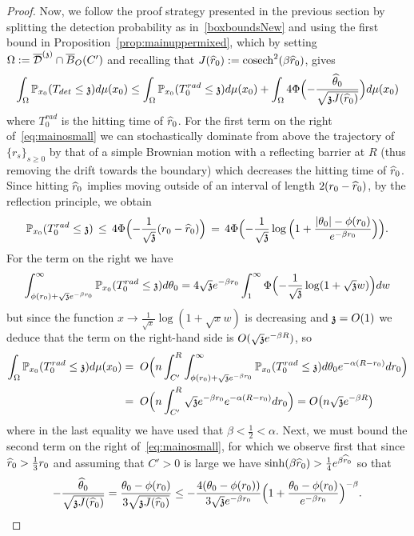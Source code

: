 \begin{proof}
Now, we follow the proof strategy presented in the previous section by splitting the detection probability as in~\eqref{boxboundsNew} and using the first bound in Proposition~\ref{prop:mainuppermixed}, which by setting $\Omega:=\ndt\cap\overline{B}_O(C')$ and recalling that $\JJ(\hatr):=\cosech^{2}(\beta\hatr)$, gives
\begin{equation}\label{eq:mainosmall}
    \int_{\Omega}\P_{x_0}(T_{det}\leq\ss)d\mu(x_0) \leq \int_{\Omega} \PP_{x_0}(T_{0}^{rad}\leq \ss)d\mu(x_0) +\int_{\Omega}4\Phi\Big({-}\frac{\hatt}{\sqrt{\ss \JJ(\hatr)}}\Big)d\mu(x_0)
\end{equation}
where $T_0^{rad}$ is the hitting time of $\hatr$. For the first term on the right of~\eqref{eq:mainosmall} we can stochastically dominate from above the trajectory of $\{r_s\}_{s\geq0}$ by that of a simple Brownian motion with a reflecting barrier at $R$ (thus removing the drift towards the boundary) which decreases the hitting time of $\hatr$. Since hitting $\hatr$ implies moving outside of an interval of length $2(r_0-\hatr)$, by the reflection principle, we obtain
\[\PP_{x_0}(T_{0}^{rad}\leq \ss)\,\leq\,4\Phi\Big({-}\frac{1}{\sqrt{\ss}}(r_0-\hatr)\Big)\,=\,4\Phi\Big({-}\frac{1}{\sqrt{\ss}}\log\Big(1+\frac{|\theta_0|-\phi(r_0)}{e^{-\beta r_0}}\Big)\Big).\]
For the term on the right we have
\[\int_{\phi(r_0)+\sqrt{\ss}e^{-\beta r_0}}^\infty\PP_{x_0}(T_{0}^{rad}\le\ss)d\theta_0=
4\sqrt{\ss}e^{-\beta r_0}\int_1^\infty \Phi\Big({-}\frac{1}{\sqrt{\ss}}\log(1+\sqrt{\ss}w)\Big)dw\]
but since the function $x\to\frac{1}{\sqrt{x}}\log(1+\sqrt{x}w)$ is decreasing and $\ss=O(1)$ we deduce that the term on the right-hand side is $O(\sqrt{\ss}e^{-\beta R})$, so
\begin{align*}
\int_{\Omega} \PP_{x_0}(T_{0}^{rad}\leq \ss)d\mu(x_0)&=\;O\Big(n\int_{C'}^R\int_{\phi(r_0)+\sqrt{\ss}e^{-\beta r_0}}^\infty\PP_{x_0}(T_{0}^{rad}\leq \ss)d\theta_0e^{-\alpha(R-r_0)}dr_0\Big)\\&=\;O\Big(n\int_{C'}^R\sqrt{\ss}e^{-\beta r_0}e^{-\alpha(R-r_0)}dr_0\Big)=O\big(n\sqrt{\ss}e^{-\beta R}\big)
\end{align*}
where in the last equality we have used that $\beta<\frac{1}{2}<\alpha$. Next, we must bound the second term on the right of~\eqref{eq:mainosmall}, for which we observe first that since $\hatr>\frac13 r_0$ and assuming that $C'>0$ is large we have $\sinh(\beta \hatr)>\frac{1}{4}e^{\beta\hatr}$ so that 
\[{-}\frac{\hatt}{\sqrt{\ss \JJ(\hatr)}}=\frac{\theta_0-\phi(r_0)}{3\sqrt{\ss J(\hatr)}}\leq {-}\frac{4(\theta_0-\phi(r_0))}{3\sqrt{\ss} e^{-\beta r_0}}\Big(1+\frac{\theta_0-\phi(r_0)}{e^{-\beta r_0}}\Big)^{-\beta}.\]

\end{proof}
